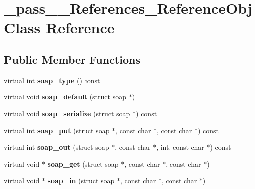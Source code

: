 \hypertarget{class__pass____References__ReferenceObj}{
\section{\_\-pass\_\-\_\-References\_\-ReferenceObj Class Reference}
\label{class__pass____References__ReferenceObj}
}
\subsection*{Public Member Functions}
\begin{DoxyCompactItemize}
\item 
\hypertarget{class__pass____References__ReferenceObj_a70820dc5164b9363bc13267647a9fb5b}{
virtual int {\bfseries soap\_\-type} () const }
\label{class__pass____References__ReferenceObj_a70820dc5164b9363bc13267647a9fb5b}

\item 
\hypertarget{class__pass____References__ReferenceObj_ad4cb887063a44469bdddda0247ae420b}{
virtual void {\bfseries soap\_\-default} (struct soap $\ast$)}
\label{class__pass____References__ReferenceObj_ad4cb887063a44469bdddda0247ae420b}

\item 
\hypertarget{class__pass____References__ReferenceObj_a80db82aa4b6d723773e700e18cae01b5}{
virtual void {\bfseries soap\_\-serialize} (struct soap $\ast$) const }
\label{class__pass____References__ReferenceObj_a80db82aa4b6d723773e700e18cae01b5}

\item 
\hypertarget{class__pass____References__ReferenceObj_af2f1d327ddcaf43956b4661115277abe}{
virtual int {\bfseries soap\_\-put} (struct soap $\ast$, const char $\ast$, const char $\ast$) const }
\label{class__pass____References__ReferenceObj_af2f1d327ddcaf43956b4661115277abe}

\item 
\hypertarget{class__pass____References__ReferenceObj_a7ab58acf8a93a5c495336ab7503b274c}{
virtual int {\bfseries soap\_\-out} (struct soap $\ast$, const char $\ast$, int, const char $\ast$) const }
\label{class__pass____References__ReferenceObj_a7ab58acf8a93a5c495336ab7503b274c}

\item 
\hypertarget{class__pass____References__ReferenceObj_a1d9773897722e7823b5af6b80137f3ff}{
virtual void $\ast$ {\bfseries soap\_\-get} (struct soap $\ast$, const char $\ast$, const char $\ast$)}
\label{class__pass____References__ReferenceObj_a1d9773897722e7823b5af6b80137f3ff}

\item 
\hypertarget{class__pass____References__ReferenceObj_a762e6914f8c7754cdbe5eb8aefa6ef3e}{
virtual void $\ast$ {\bfseries soap\_\-in} (struct soap $\ast$, const char $\ast$, const char $\ast$)}
\label{class__pass____References__ReferenceObj_a762e6914f8c7754cdbe5eb8aefa6ef3e}

\end{DoxyCompactItemize}
